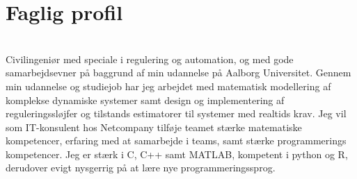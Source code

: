 \documentclass[a4paper]{twentysecondcv} %
\begin{document}

\aboutme{}




\skillstext{}


\makeprofile %


\section{Faglig profil}\\[0.2cm]
Civilingeniør med speciale i regulering og automation, og med gode samarbejdsevner på baggrund af min udannelse på Aalborg Universitet. Gennem min udannelse og studiejob har jeg arbejdet med matematisk modellering af komplekse dynamiske systemer samt design og implementering af reguleringssløjfer og tilstands estimatorer til systemer med realtids krav. Jeg vil som IT-konsulent hos Netcompany tilføje teamet stærke matematiske kompetencer, erfaring med at samarbejde i teams, samt stærke programmerings kompetencer. Jeg er stærk i C, C++ samt MATLAB, kompetent i python og R, derudover evigt nysgerrig på at lære nye programmeringssprog.
\end{document}
